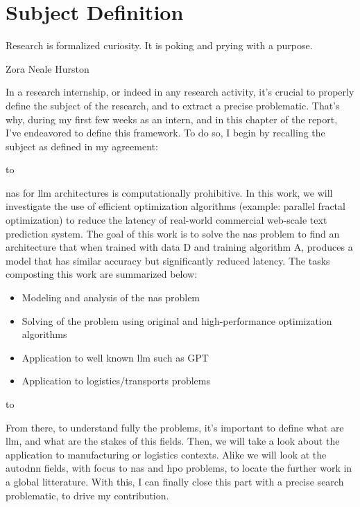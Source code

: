 \chapter{Subject Definition}
\label{chap:subject_def}

\epigraph{Research is formalized curiosity. It is poking and prying with a purpose.}{Zora Neale Hurston}

In a research internship, or indeed in any research activity, it's crucial to properly define the subject of the research, and to extract a precise problematic. That's why, during my first few weeks as an intern, and in this chapter of the report, I've endeavored to define this framework. To do so, I begin by recalling the subject as defined in my agreement: 

\noindent\hbox to \textwidth{\hrulefill}

\acrshort{nas} for \acrshort{llm} architectures is computationally prohibitive. In this work, we will investigate the use of efficient optimization algorithms (example: parallel fractal optimization) to reduce the latency of real-world commercial web-scale text prediction system. The goal of this work is to solve the \acrshort{nas} problem to find an architecture that when trained with data D and training algorithm A, produces a model that has similar accuracy but significantly reduced latency.
The tasks composting this work are summarized below:
\begin{itemize}
    \item Modeling and analysis of the \acrshort{nas} problem
    \item Solving of the problem using original and high-performance optimization algorithms
    \item Application to well known \acrshort{llm} such as GPT
    \item Application to logistics/transports problems
\end{itemize}
\noindent\hbox to \textwidth{\hrulefill}


From there, to understand fully the problems, it's important to define what are \acrshort{llm}, and what are the stakes of this fields. Then, we will take a look about the application to manufacturing or logistics contexts. Alike we will look at the \acrshort{autodnn} fields, with focus to \acrshort{nas} and \acrshort{hpo} problems, to locate the further work in a global litterature. With this, I can finally close this part with a precise search problematic, to drive my contribution.


